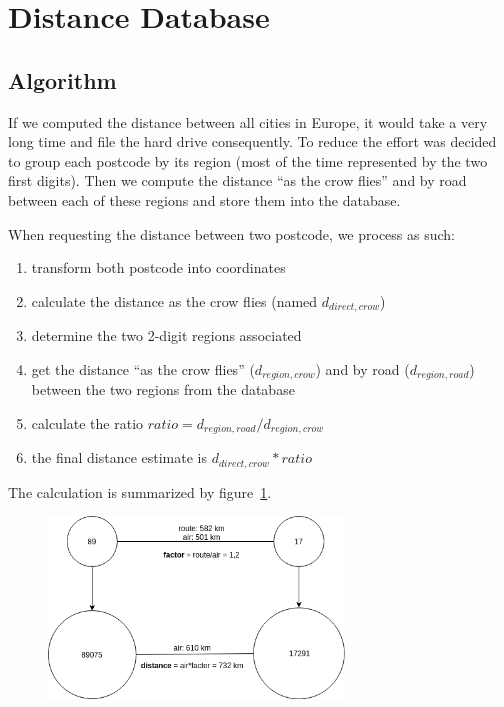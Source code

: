 
\section{Distance Database}

\subsection{Algorithm}\label{distance_algorithm}

If we computed the distance between all cities in Europe, it would take a very
long time and file the hard drive consequently.
To reduce the effort was decided to group each postcode by its region (most of the
time represented by the two first digits). Then we compute the distance ``as the
crow flies'' and by road between each of these regions and store them into the database.

When requesting the distance between two postcode, we process as such:
\begin{enumerate}
  \item transform both postcode into coordinates
  \item calculate the distance as the crow flies (named $d_{direct,crow}$)
  \item determine the two 2-digit regions associated
  \item get the distance ``as the crow flies'' ($d_{region,crow}$) and by road
      ($d_{region,road}$) between the two regions from the database
  \item calculate the ratio $ratio = d_{region,road}/d_{region,crow}$
  \item the final distance estimate is $d_{direct,crow} * ratio$
\end{enumerate}

The calculation is summarized by figure~\ref{fig:calc}.
\begin{figure}[H]
\centering
\includegraphics[width=0.7\textwidth]{img/calc}
\label{fig:calc}
\end{figure}

